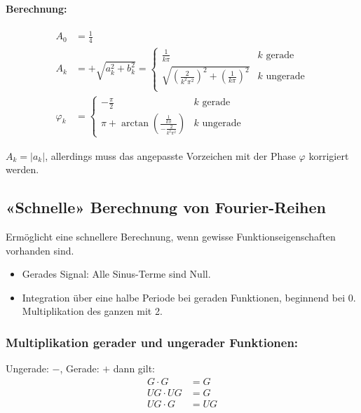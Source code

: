 \paragraph{Berechnung:}

\begin{align*}
	A_0 &= \frac{1}{4} \\
	A_k &= +\sqrt{a_k^2 + b_k^2} = \begin{cases}
		\frac{1}{k \pi} & k \text{ gerade} \\
		\sqrt{\left(\frac{2}{k^2\pi^2}\right)^2 + \left(\frac{1}{k \pi}\right)^2} & k \text{ ungerade} \\
	\end{cases} \\
	\varphi_k &= \begin{cases}
		-\frac{\pi}{2} & k \text{ gerade} \\
		\pi + \arctan\left( \frac{\frac{1}{k \pi}}{-\frac{2}{k^2 \pi^2}} \right)& k \text{ ungerade}
	\end{cases}
\end{align*}


$A_k = \left| a_k \right|$, allerdings muss das angepasste Vorzeichen mit der Phase $\varphi$ korrigiert werden.


\subsection{«Schnelle» Berechnung von Fourier-Reihen}

Ermöglicht eine schnellere Berechnung, wenn gewisse Funktionseigenschaften vorhanden sind.

\begin{itemize}
\item Gerades Signal: Alle Sinus-Terme sind Null.
\item Integration über eine halbe Periode bei geraden Funktionen, beginnend bei 0. \\
		Multiplikation des ganzen mit 2.
\end{itemize}

\subsubsection{Multiplikation gerader und ungerader Funktionen:}

Ungerade: $-$, Gerade: $+$ dann gilt:
\begin{align*}
	 G \cdot G &= G \\
	 UG \cdot UG &= G \\
	 UG \cdot G &= UG \\
\end{align*}

